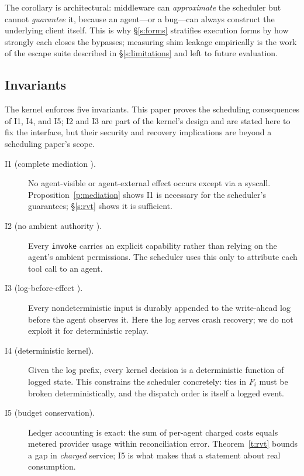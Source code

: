\documentclass[letterpaper,11pt,leqno]{article}
\begin{document}
The corollary is architectural: middleware can \emph{approximate} the scheduler but cannot \emph{guarantee} it, because an agent---or a bug---can always construct the underlying client itself. This is why \S\ref{s:forms} stratifies execution forms by how strongly each closes the bypasses; measuring shim leakage empirically is the work of the escape suite described in \S\ref{s:limitations} and left to future evaluation.

\subsection{Invariants}\label{s:invariants}

The kernel enforces five invariants. This paper proves the scheduling consequences of I1, I4, and I5; I2 and I3 are part of the kernel's design and are stated here to fix the interface, but their security and recovery implications are beyond a scheduling paper's scope.

\begin{description}
\item[I1 (complete mediation \citep{Saltzer75}).] No agent-visible or agent-external effect occurs except via a syscall. Proposition~\ref{p:mediation} shows I1 is necessary for the scheduler's guarantees; \S\ref{s:rvt} shows it is sufficient.
\item[I2 (no ambient authority \citep{Dennis66, Miller06}).] Every \texttt{invoke} carries an explicit capability rather than relying on the agent's ambient permissions. The scheduler uses this only to attribute each tool call to an agent.
\item[I3 (log-before-effect \citep{Mohan92}).] Every nondeterministic input is durably appended to the write-ahead log before the agent observes it. Here the log serves crash recovery; we do not exploit it for deterministic replay.
\item[I4 (deterministic kernel).] Given the log prefix, every kernel decision is a deterministic function of logged state. This constrains the scheduler concretely: ties in $F_i$ must be broken deterministically, and the dispatch order is itself a logged event.
\item[I5 (budget conservation).] Ledger accounting is exact: the sum of per-agent charged costs equals metered provider usage within reconciliation error. Theorem~\ref{t:rvt} bounds a gap in \emph{charged} service; I5 is what makes that a statement about real consumption.
\end{description}
\end{document}
